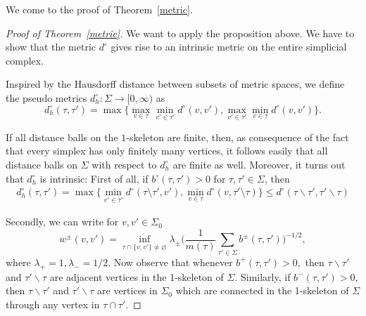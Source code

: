 \documentclass[10pt]{amsart}
\theoremstyle{definition}
\renewcommand{\bullet}{{\circ}}
\newcommand{\eat}[1]{}
\begin{document}
We come to the proof of Theorem~\ref{metric}.

\begin{proof}[Proof of  Theorem~\ref{metric}] We want to apply the proposition above. We have to show that the metric $d^\bullet $ gives rise to an intrinsic metric on the entire simplicial complex.
	
Inspired by the Hausdorff distance between subsets of metric spaces, we define the pseudo metrics $d_{h}^{\circ}:\Sigma\rightarrow[0,\infty)$ as
	$$d_h^{\circ}(\tau,\tau') = \max\lbrace \max_{v\in\tau}\min_{v'\in\tau'}d^{\circ}(v,v'),\max_{v'\in\tau'}\min_{v\in\tau}d^{\circ}(v,v')\rbrace.$$
	
If all distance balls on the  $1$-skeleton are finite, then, as consequence of the fact that every simplex has only finitely many vertices, it follows easily that all distance balls on $\Sigma$ with respect to $d_h^\circ$ are finite as well. Moreover, it turns out that $d_h^\circ$ is intrinsic: First of all, if $b^{\circ}(\tau,\tau')>0$  for $\tau,\tau'\in\Sigma$, then
\begin{align*}
	d_h^{\circ}(\tau,\tau') = \max\{\min_{v'\in \tau'}d^{\circ}(\tau\setminus \tau',v'),\min_{v\in \tau}d^{\circ}(v,\tau'\setminus \tau)\}\leq  d^{\circ}(\tau\backslash\tau',\tau'\backslash\tau)
\end{align*}
\eat{ if $b^{+}(\tau,\tau')>0$  for $\tau,\tau'\in\Sigma$, then
	\begin{align*}
d_h^{+}(\tau,\tau') = d^{+}(\tau\setminus \tau',\tau'\setminus \tau)\leq w(\tau\backslash\tau',\tau'\backslash\tau)%
\end{align*}
and if $b^{-}(\tau,\tau')>0$  for $\tau,\tau'\in\Sigma$, then
\begin{align*}
d_h^{-}(\tau,\tau') = \max\{\min_{v'\in \tau'}d(\tau\setminus \tau',v'),\min_{v\in \tau}d(v,\tau'\setminus \tau)\}\leq  w(\tau\backslash\tau',\tau'\backslash\tau)
\end{align*}}
Secondly, we can write for $v,v'\in\Sigma_{0}$
\begin{equation*}
	w^{\pm}(v,v')=\inf_{\tau\cap \{v,v'\}\neq\varnothing}
	\lambda_\pm\Big(\frac{1}{m(\tau)}\sum_{\tau'\in\Sigma}b^{\pm}(\tau,\tau')\Big)^{-1/2},
\end{equation*}
where $\lambda_+ = 1,\lambda_- = 1\slash 2.$ Now observe that whenever $b^+(\tau,\tau')>0,$ then $\tau\backslash\tau'$ and $\tau'\backslash\tau$ are adjacent vertices in the 1-skeleton of $\Sigma.$ Similarly, if $b^-(\tau,\tau')>0,$ then $\tau\backslash\tau'$ and $\tau'\backslash\tau$ are vertices in $\Sigma_0$ which are connected in the 1-skeleton of $\Sigma$ through any vertex in $\tau\cap\tau'.$

\end{proof}
\end{document}
